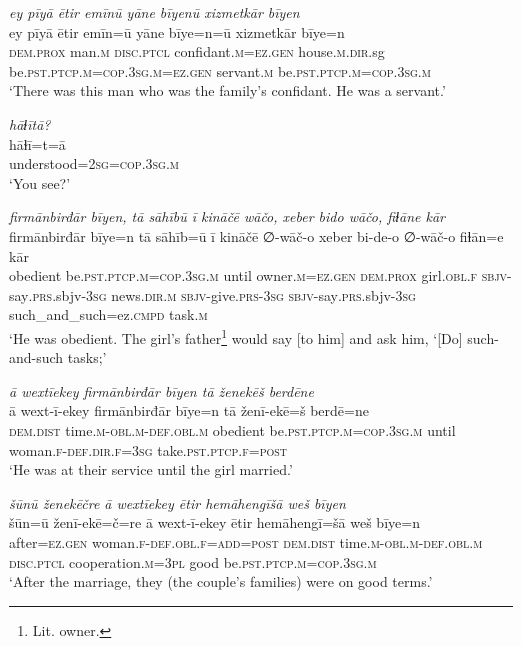 \ea \label{RE.16}
\textit{ey pīyā ētir emīnū yāne bīyenū xizmetkār bīyen} \\ 
\gll ey pīyā ētir emīn=ū yāne bīye=n=ū xizmetkār bīye=n \\ 
 \textsc{dem.prox} man\textsc{.m} \textsc{disc.ptcl} confidant\textsc{.m}\textsc{=ez.gen} house\textsc{.m}\textsc{.dir}.sg be\textsc{.pst}\textsc{.ptcp}\textsc{.m}\textsc{=cop}\textsc{.3sg}\textsc{.m}\textsc{=ez.gen} servant\textsc{.m} be\textsc{.pst}\textsc{.ptcp}\textsc{.m}\textsc{=cop}\textsc{.3sg}\textsc{.m} \\ 
\glt `There was this man who was the family’s confidant. He was a servant.'
\z 
 
\ea \label{RE.17}
\textit{hāɫītā?} \\ 
\gll hāɫī=t=ā \\ 
 understood\textsc{=\textsc{2sg}}\textsc{=cop}\textsc{.3sg}\textsc{.m} \\ 
\glt `You see?'
\z 
 
\ea \label{RE.18}
\textit{firmānbirđār bīyen, tā sāhībū ī kināčē wāčo, xeber bido wāčo, fiɫāne kār} \\ 
\gll firmānbirđār bīye=n tā sāhīb=ū ī kināčē ∅-wāč-o xeber bi-de-o ∅-wāč-o fiɫān=e kār \\ 
 obedient be\textsc{.pst}\textsc{.ptcp}\textsc{.m}\textsc{=cop}\textsc{.3sg}\textsc{.m} until owner\textsc{.m}\textsc{=ez.gen} \textsc{dem.prox} girl\textsc{.obl}\textsc{.f} \textsc{sbjv-}say\textsc{.prs}.sbjv\textsc{-3sg} news\textsc{.dir}\textsc{.m} \textsc{sbjv-}give\textsc{.prs}\textsc{-3sg} \textsc{sbjv-}say\textsc{.prs}.sbjv\textsc{-3sg} such\_and\_such=ez\textsc{.cmpd} task\textsc{.m} \\ 
\glt `He was obedient. The girl’s father\footnote{Lit. owner.} would say [to him] and ask him, ‘[Do] such-and-such tasks;'
\z 
 
\ea \label{RE.21}
\textit{ā wextīekey firmānbirđār bīyen tā ženekēš berdēne} \\ 
\gll ā wext-ī-ekey firmānbirđār bīye=n tā ženī-ekē=š berdē=ne \\ 
 \textsc{dem.dist} time\textsc{.m}\textsc{-obl}\textsc{.m}\textsc{-def}\textsc{.obl}\textsc{.m} obedient be\textsc{.pst}\textsc{.ptcp}\textsc{.m}\textsc{=cop}\textsc{.3sg}\textsc{.m} until woman\textsc{.f}\textsc{-def}\textsc{.dir}\textsc{.f}\textsc{=3sg} take\textsc{.pst}\textsc{.ptcp}\textsc{.f}\textsc{=\textsc{post}} \\ 
\glt `He was at their service until the girl married.'
\z 
 
\ea \label{RE.22}
\textit{šūnū ženekēčre ā wextīekey ētir hemāhengīšā weš bīyen} \\ 
\gll šūn=ū ženī-ekē=č=re ā wext-ī-ekey ētir hemāhengī=šā weš bīye=n \\ 
 after\textsc{=ez.gen} woman\textsc{.f}\textsc{-def}\textsc{.obl}\textsc{.f}\textsc{=add}\textsc{=\textsc{post}} \textsc{dem.dist} time\textsc{.m}\textsc{-obl}\textsc{.m}\textsc{-def}\textsc{.obl}\textsc{.m} \textsc{disc.ptcl} cooperation\textsc{.m}\textsc{=3pl} good be\textsc{.pst}\textsc{.ptcp}\textsc{.m}\textsc{=cop}\textsc{.3sg}\textsc{.m} \\ 
\glt `After the marriage, they (the couple's families) were on good terms.'
\z 
 
